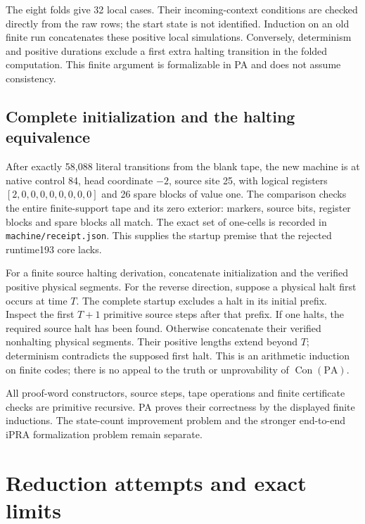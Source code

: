 \documentclass[11pt,letterpaper]{article}
\newcommand{\PA}{\mathrm{PA}}
\newcommand{\Con}{\operatorname{Con}}
\newcommand{\file}[1]{\texttt{\nolinkurl{#1}}}
\begin{document}
The eight folds give 32 local cases. Their incoming-context conditions are
checked directly from the raw rows; the start state is not identified.
Induction on an old finite run concatenates these positive local
simulations. Conversely, determinism and positive durations exclude a
first extra halting transition in the folded computation. This finite
argument is formalizable in PA and does not assume consistency.



\subsection{Complete initialization and the halting equivalence}

After exactly 58,088 literal transitions from the blank tape, the new
machine is at native control 84, head coordinate $-2$, source site 25,
with logical registers $[2,0,0,0,0,0,0,0,0]$ and 26 spare blocks of value
one. The comparison checks the entire finite-support tape and its zero
exterior: markers, source bits, register blocks and spare blocks all match.
The exact set of one-cells is recorded in \file{machine/receipt.json}.
This supplies the startup premise that the rejected runtime193 core lacks.

For a finite source halting derivation, concatenate initialization and the
verified positive physical segments. For the reverse direction, suppose a physical halt first occurs at time
$T$. The complete startup excludes a halt in its initial prefix. Inspect
the first $T+1$ primitive source steps after that prefix. If one halts, the
required source halt has been found. Otherwise concatenate their verified
nonhalting physical segments. Their positive lengths extend beyond $T$;
determinism contradicts the supposed first halt. This is an arithmetic induction on finite codes;
there is no appeal to the truth or unprovability of $\Con(\PA)$.

All proof-word constructors, source steps, tape operations and finite
certificate checks are primitive recursive. PA proves their correctness
by the displayed finite inductions. The state-count improvement problem
and the stronger end-to-end iPRA formalization problem remain separate.

\section{Reduction attempts and exact limits}
\label{sec:search}

\end{document}
